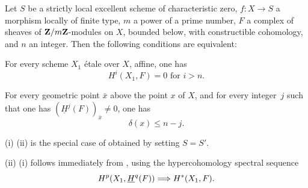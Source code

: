 \begin{corollary} \label{XIV.3.7}
Let $S$ be a strictly local excellent scheme of characteristic zero, $f:X \to S$ a morphism locally of finite type, $m$ a power of a prime number, $F$ a complex of sheaves of $\mathbf{Z}/m\mathbf{Z}$-modules on $X$, bounded below, with constructible cohomology, and $n$ an integer. Then the following conditions are equivalent:
\begin{enumeratei}
\item
For every scheme $X_1$ \'etale over $X$, affine, one has
$$
H^i(X_1, F)=0\text{ for }i>n.
$$

\item
For every geometric point $\bar{x}$ above the point $x$ of $X$, and for every integer~$j$ such that one has $(\underline{H}^j(F))_{\bar{x}} \neq 0$, one has
$$
\delta(x) \leq n-j.
$$
\end{enumeratei}
\end{corollary}

\textup{(i)} \ALORS \textup{(ii)} is the special case of  obtained by setting $S=S'$.

\textup{(ii)} \ALORS \textup{(i)} follows immediately from , using the hypercohomology spectral sequence
$$
H^p(X_1, \underline{H}^q(F)) \To H^*(X_1, F).
$$
